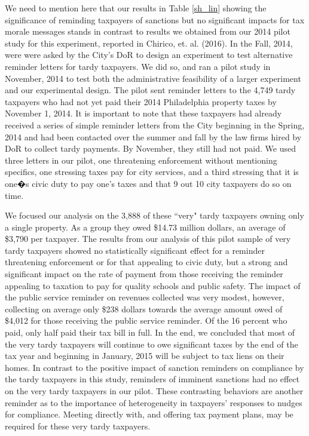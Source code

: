 \documentclass[12pt]{article}
\begin{document}
We need to mention here that our results in Table \ref{sh_lin} showing
the significance of reminding taxpayers of sanctions but no
significant impacts for tax morale messages stands in contrast to
results we obtained from our 2014 pilot study for this experiment,
reported in Chirico, et. al. (2016).  In the Fall, 2014, were were
asked by the City's DoR to design an experiment to test alternative
reminder letters for tardy taxpayers.  We did so, and ran a pilot
study in November, 2014 to test both the administrative feasibility of
a larger experiment and our experimental design.  The pilot sent
reminder letters to the 4,749 tardy taxpayers who had not yet paid
their 2014 Philadelphia property taxes by November 1, 2014.  It is
important to note that these taxpayers had already received a series
of simple reminder letters from the City beginning in the Spring, 2014
and had been contacted over the summer and fall by the law firms hired
by DoR to collect tardy payments.  By November, they still had not
paid.  We used three letters in our pilot, one threatening
enforcement without mentioning specifics, one stressing taxes pay for
city services, and a third stressing that it is one�s civic duty to
pay one's taxes and that 9 out 10 city taxpayers do so on time.

We focused our analysis on the 3,888 of these ``very" tardy taxpayers
owning only a single property. As a group they owed \$14.73 million
dollars, an average of \$3,790 per taxpayer. The results from our
analysis of this pilot sample of very tardy taxpayers showed no
statistically significant effect for a reminder threatening
enforcement or for that appealing to civic duty, but a strong and
significant impact on the rate of payment from those receiving the
reminder appealing to taxation to pay for quality schools and public
safety.  The impact of the public service reminder on revenues
collected was very modest, however, collecting on average only \$238
dollars towards the average amount owed of \$4,012 for those receiving
the public service reminder.  Of the 16 percent who paid, only half
paid their tax bill in full.  In the end, we concluded that most of
the very tardy taxpayers will continue to owe significant taxes by the
end of the tax year and beginning in January, 2015 will be subject to
tax liens on their homes.  In contrast to the positive impact of
sanction reminders on compliance by the tardy taxpayers in this study,
reminders of imminent sanctions had no effect on the very tardy
taxpayers in our pilot.  These contrasting behaviors are another
reminder as to the importance of heterogeneity in taxpayers' responses
to nudges for compliance.  Meeting directly with, and offering tax
payment plans, may be required for these very tardy taxpayers.
\end{document}
